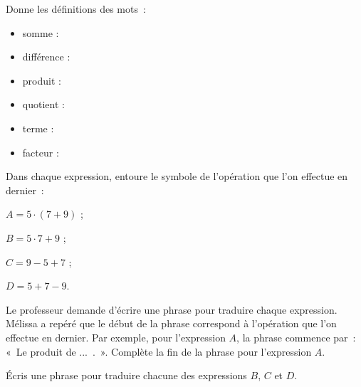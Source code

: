 \begin{activite}

\begin{partie}
Donne les définitions des mots : 
\begin{itemize}
\item somme : \dotfill
\item différence :\dotfill
\item produit :\dotfill
\item quotient :\dotfill
\item terme :\dotfill
\item facteur :\dotfill
\end{itemize}

\end{partie}

\begin{partie}
Dans chaque expression, entoure le symbole de l'opération que l'on effectue en dernier :
\begin{colitemize}{4}
 \item $A = 5 \cdot (7 + 9)$ ;
 \item $B = 5 \cdot 7 + 9$ ;
 \item $C = 9 - 5 + 7$ ;
 \item $D = 5 + 7 - 9$.
 \end{colitemize}
\end{partie}

\begin{partie}
Le professeur demande d'écrire une phrase pour traduire chaque expression. Mélissa a repéré que le début de la phrase correspond à l'opération que l'on effectue en dernier. Par exemple, pour l'expression $A$, la phrase commence par : « Le produit de ... . ». Complète la fin de la phrase pour l'expression $A$.
\end{partie}

\begin{partie}
Écris une phrase pour traduire chacune des expressions $B$, $C$ et $D$.
\end{partie}

\end{activite}
